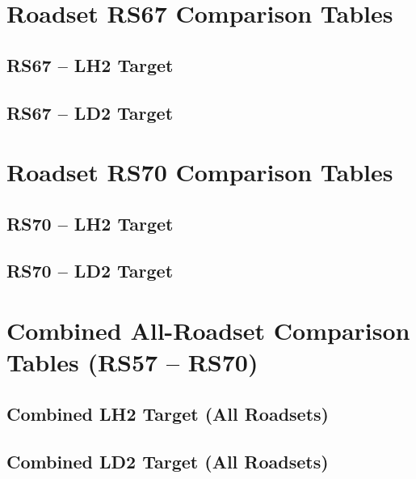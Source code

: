 \documentclass[11pt, letterpaper]{article}
\begin{document}
\section{Roadset RS67 Comparison Tables}
\subsection{RS67 -- LH2 Target}


\subsection{RS67 -- LD2 Target}


\clearpage

\section{Roadset RS70 Comparison Tables}
\subsection{RS70 -- LH2 Target}


\subsection{RS70 -- LD2 Target}


\clearpage

\section{Combined All-Roadset Comparison Tables (RS57 -- RS70)}
\subsection{Combined LH2 Target (All Roadsets)}

\clearpage

\subsection{Combined LD2 Target (All Roadsets)}

\clearpage
\end{document}
